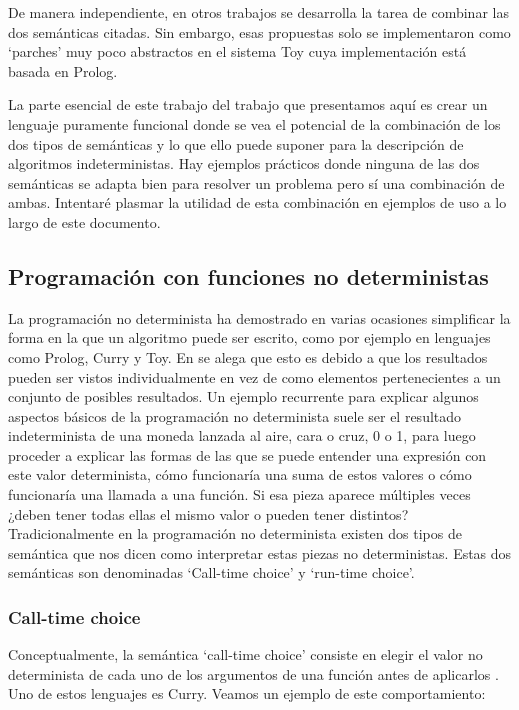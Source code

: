 \documentclass[class=article, crop=false]{standalone}
\begin{document}
De manera independiente, en otros trabajos \cite{riesco2014singular} se desarrolla la tarea
de combinar las dos semánticas citadas. Sin embargo, esas propuestas solo se implementaron
como `parches' muy poco abstractos en el sistema Toy cuya implementación está basada en
Prolog.

La parte esencial de este trabajo del trabajo que presentamos aquí es crear un lenguaje
puramente funcional donde se vea el potencial de la combinación de los dos tipos de
semánticas y lo que ello puede suponer para la descripción de algoritmos indeterministas.
Hay ejemplos prácticos donde ninguna de las dos semánticas se adapta bien para resolver un
problema pero sí una combinación de ambas. Intentaré plasmar la utilidad de esta combinación
en ejemplos de uso a lo largo de este documento.

\subsection{Programación con funciones no deterministas}\label{sec:prog_func_ind}
La programación no determinista ha demostrado en varias ocasiones simplificar la forma en la
que un algoritmo puede ser escrito, como por ejemplo en lenguajes como Prolog, Curry y Toy.
En \cite{antoy2010functional} se alega que esto es debido a que los resultados pueden ser
vistos individualmente en vez de como elementos pertenecientes a un conjunto de posibles
resultados. Un ejemplo recurrente para explicar algunos aspectos básicos de la programación
no determinista suele ser el resultado indeterminista de una moneda lanzada al aire, cara o
cruz, 0 o 1, para luego proceder a explicar las formas de las que se puede entender una
expresión con este valor determinista, cómo funcionaría una suma de estos valores o cómo
funcionaría una llamada a una función. Si esa pieza aparece múltiples veces ¿deben tener
todas ellas el mismo valor o pueden tener distintos? Tradicionalmente en la programación no
determinista existen dos tipos de semántica que nos dicen como interpretar estas piezas no
deterministas. Estas dos semánticas son denominadas `Call-time choice' y `run-time choice'.

\subsubsection{Call-time choice}
Conceptualmente, la semántica `call-time choice' consiste en elegir el valor no determinista
de cada uno de los argumentos de una función antes de aplicarlos \cite{fischer2011purely}.
Uno de estos lenguajes es Curry. Veamos un ejemplo de este comportamiento:
\end{document}
